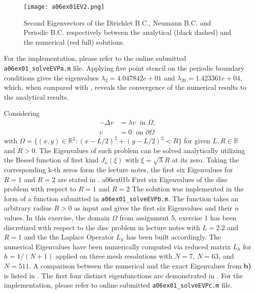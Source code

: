 \begin{figure}[H]
	\vspace*{\FigUpperVSpace}
	\centering
	\texttt{[image: a06ex01EV2.png]} 
	\caption{Second Eigenvectors of the Dirichlet B.C., Neumann B.C. and Periodic B.C. respectively between the analytical (black dashed) and the numerical (red full) solutions.}
	\label{fig:a06ex01a}
\end{figure}
%
For the implementation, please refer to the online submitted \texttt{a06ex01\_solveEVPa.m} file.
%
Applying five point stencil on the periodic boundary conditions gives the eigenvalues $\lambda_2 = 4.047842e+01$ and $\lambda_{20} = 1.423361e+04$, which, when compared with , reveals the convergence of the numerical results to the analytical results.


%
Considering
\begin{align}
	-\Delta v &= \lambda v \;\text{ in } \Omega, \\
			v &= 0 		   \;\text{ on } \partial\Omega
\end{align}
with $\Omega = \{(x,y) \in \mathbb{R}^2 \colon \left(x-L/2\right)^2 + \left(y-L/2\right)^2 < R\}$ for given $L, R \in \mathbb{R}$ and $R>0$.
The Eigenvalues of such problem can be solved analytically utilizing the Bessel function of first kind $J_n(\xi)$ with $\xi = \sqrt{\lambda} R$ at its zero.
Taking the corresponding k-th zeros form the lecture notes, the first six Eigenvalues for $R=1$ and $R=2$  are stated in .
%
\vspace*{2\FigUpperVSpace}
		 {a06ex01b}
		 {First six Eigenvalues of the disc problem with respect to $R=1$ and $R=2$}
%
The solution was implemented in the form of a function submitted in \texttt{a06ex01\_solveEVPb.m}.
The function takes an arbitrary radius $R>0$ as input and gives the first six Eigenvalues and their $n$ values. 
%
In this exercise, the domain $\Omega$ from assignment 5, exercise 1 has been discretized with respect to the disc problem in lecture notes with $L=2.2$ and $R=1$ and the the Laplace Operator $L_h$ has been built accordingly.
The numerical Eigenvalues have been numerically computed via reduced matrix $L_h$ for $h=1/(N+1)$ applied on three mesh resolutions with $N=7$, $N=63$, and $N=511$.
A comparison between the numerical and the exact Eigenvalues from \textbf{b)} is listed in .
The first four distinct eigenfunctions are demonstrated in .
For the implementation, please refer to online submitted \texttt{a06ex01\_solveEVPc.m} file.
